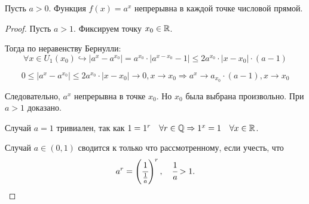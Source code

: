 \begin{theorem}
    Пусть $a > 0$. Функция $f(x) = a^{x}$ непрерывна в каждой точке числовой прямой.
\end{theorem}
\begin{proof}
    Пусть $a > 1$.
    Фиксируем точку $x_{0} \in \mathbb{R}$.

    Тогда по неравенству Бернулли:
    $$\forall x \in U_{1}(x_{0}) \hookrightarrow |a^{x} - a^{x_{0}}| = a^{x_{0}}\cdot|a^{x-x_{0}} - 1| \leq 2 a^{x_{0}} \cdot |x - x_{0}| \cdot (a-1)
    $$
    
    $$
    0 \leq |a^{x} - a^{x_{0}}| \leq 2 a^{x_{0}} \cdot |x - x_{0}| \to 0, x \to x_{0} \Rightarrow a^{x} \to a_{x_{0}}\cdot (a-1), x \to x_{0}
    $$

    Следовательно, $a^{x}$ непрерывна в точке $x_{0}$. Но $x_{0}$ была выбрана произвольно. При $a > 1$ доказано.
    
    Случай $a = 1$ тривиален, так как $1 = 1^{r} \quad \forall r \in \mathbb{Q} \Rightarrow 1^{x} = 1  \quad \forall x \in \mathbb{R}$.

    Случай $a \in (0, 1)$ сводится к только что рассмотренному, если учесть, что 
    $$a^{r} = \left(\cfrac{1}{\frac{1}{a}}\right)^r, \quad \cfrac{1}{a} > 1.$$
\end{proof}
